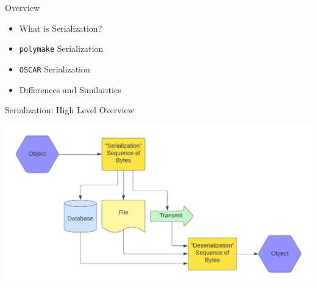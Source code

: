 \documentclass[9pt]{beamer}
\author[Antony Della Vecchia]{Antony Della Vecchia }
\title{}
\institute[]{
Technische Universit\"at Berlin
}
\date{
  2024-02-05
}
\newcommand\oscar{\texttt{OSCAR}\xspace}
\theoremstyle{definition}
\begin{document}
\maketitle

\begin{frame}[fragile]{Overview}
  \begin{itemize}
  \item What is Serialization?
  \item \texttt{polymake} Serialization
  \item \oscar Serialization
  \item Differences and Similarities
  \end{itemize}
\end{frame}


\begin{frame}[fragile]{Serialization: High Level Overview}
  \begin{center}
    \includegraphics[height=0.7\textheight]{images/serialization}
  \end{center}
\end{frame}

\end{document}

